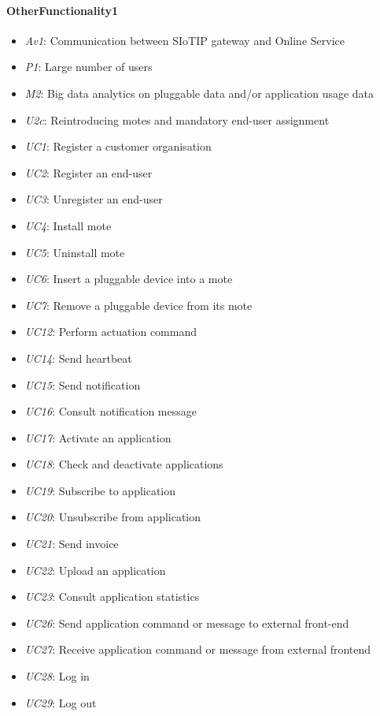 \documentclass[english]{sareport}
\begin{document}
\paragraph{OtherFunctionality1}
\begin{itemize}
	\item \emph{Av1}: Communication between SIoTIP gateway and Online Service
	\item \emph{P1}: Large number of users
	\item \emph{M2}: Big data analytics on pluggable data and/or application usage data
	\item \emph{U2c}: Reintroducing motes  and mandatory end-user assignment
	\item \emph{UC1}: Register a customer organisation
	\item \emph{UC2}: Register an end-user
	\item \emph{UC3}: Unregister an end-user
	\item \emph{UC4}: Install mote
	\item \emph{UC5}: Uninstall mote
	\item \emph{UC6}: Insert a pluggable device into a mote
	\item \emph{UC7}: Remove a pluggable device from its mote
	\item \emph{UC12}: Perform actuation command
	\item \emph{UC14}: Send heartbeat
	\item \emph{UC15}: Send notification
	\item \emph{UC16}: Consult notification message
	\item \emph{UC17}: Activate an application
	\item \emph{UC18}: Check and deactivate applications
	\item \emph{UC19}: Subscribe to application
	\item \emph{UC20}: Unsubscribe from application
	\item \emph{UC21}: Send invoice
	\item \emph{UC22}: Upload an application
	\item \emph{UC23}: Consult application statistics
	\item \emph{UC26}: Send application command or message to external front-end
	\item \emph{UC27}: Receive application command or message from external frontend
	\item \emph{UC28}: Log in
	\item \emph{UC29}: Log out
\end{itemize}
\end{document}
